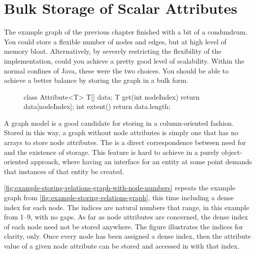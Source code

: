 \section{Bulk Storage of Scalar Attributes}
 
The example graph of the previous chapter finished with a bit of a condundrum.
You could store a flexible number of nodes and edges, but at high level of
memory bloat. Alternatively, by severely restricting the flexibility of the
implementation, could you achieve a pretty good level of scalability. Within the
normal confines of Java, these were the two choices. You should be able to
achieve a better balance by storing the graph in a bulk form.

\begin{figure}
\vspace{-2mm}
\begin{framedlisting}
class Attribute<T> {
  T[] data;
  T get(int nodeIndex) {
     return data[nodeIndex];
  }
  int extent() {
    return data.length;
  }
}
\end{framedlisting}
\end{figure}
A graph model is a good candidate for storing in a column-oriented fashion.
Stored in this way, a graph without node attributes is simply one that has no
arrays to store node attributes. The is a direct correspondence between need for
and the existence of storage. This feature is hard to achieve in a purely
object-oriented approach, where having an interface for an entity at some point
demands that instances of that entity be created.

\autoref{fig:example-storing-relations-graph-with-node-numbers} repeats the
example graph from \autoref{fig:example-storing-relations-graph}, this time
including a dense index for each node. The indices are natural numbers that
range, in this example from 1--9, with no gaps. As far as node attributes are
concerned, the dense index of each node need not be stored anywhere. The figure
illustrates the indices for clarity, only. Once every node has been assigned a
dense index, then the attribute value of a given node attribute can be stored
and accessed in with that index.

